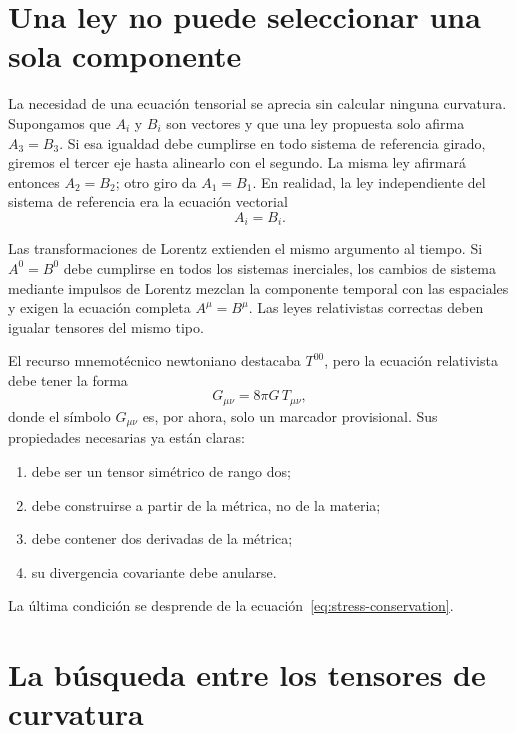 \section{Una ley no puede seleccionar una sola componente}

La necesidad de una ecuación tensorial se aprecia sin calcular ninguna curvatura. Supongamos que \(A_i\) y \(B_i\) son vectores y que una ley propuesta solo afirma \(A_3=B_3\). Si esa igualdad debe cumplirse en todo sistema de referencia girado, giremos el tercer eje hasta alinearlo con el segundo. La misma ley afirmará entonces \(A_2=B_2\); otro giro da \(A_1=B_1\). En realidad, la ley independiente del sistema de referencia era la ecuación vectorial
\begin{equation}
 A_i=B_i.
\end{equation}

Las transformaciones de Lorentz extienden el mismo argumento al tiempo. Si \(A^0=B^0\) debe cumplirse en todos los sistemas inerciales, los cambios de sistema mediante impulsos de Lorentz mezclan la componente temporal con las espaciales y exigen la ecuación completa \(A^\mu=B^\mu\). Las leyes relativistas correctas deben igualar tensores del mismo tipo.

El recurso mnemotécnico newtoniano destacaba \(T^{00}\), pero la ecuación relativista debe tener la forma
\begin{equation}
 G_{\mu\nu}=8\pi G\,T_{\mu\nu},
 \label{eq:field-schematic}
\end{equation}
donde el símbolo \(G_{\mu\nu}\) es, por ahora, solo un marcador provisional. Sus propiedades necesarias ya están claras:
\begin{enumerate}
 \item debe ser un tensor simétrico de rango dos;
 \item debe construirse a partir de la métrica, no de la materia;
 \item debe contener dos derivadas de la métrica;
 \item su divergencia covariante debe anularse.
\end{enumerate}
La última condición se desprende de la ecuación~\eqref{eq:stress-conservation}.

\section{La búsqueda entre los tensores de curvatura}

